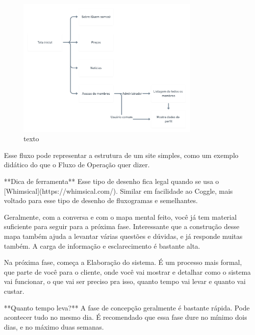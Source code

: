 \documentclass[a4paper, 12pt, oneside]{book}
\begin{document}
\begin{figure}[H]
	\caption{texto}
	\centering
	\includegraphics[width=0.8\textwidth]{Postagens2x.png}
\end{figure}

Esse fluxo pode representar a estrutura de um site simples, como um exemplo didático do que o Fluxo de Operação quer dizer.

**Dica de ferramenta**
Esse tipo de desenho fica legal quando se usa o [Whimsical](https://whimsical.com/). Similar em facilidade ao Coggle, mais voltado para esse tipo de desenho de fluxogramas e semelhantes.

Geralmente, com a conversa e com o mapa mental feito, você já tem material suficiente para seguir para a próxima fase. Interessante que a construção desse mapa também ajuda a levantar várias questões e dúvidas, e já responde muitas também. A carga de informação e esclarecimento é bastante alta.

Na próxima fase, começa a Elaboração do sistema. É um processo mais formal, que parte de você para o cliente, onde você vai mostrar e detalhar como o sistema vai funcionar, o que vai ser preciso pra isso, quanto tempo vai levar e quanto vai custar.

**Quanto tempo leva?**
A fase de concepção geralmente é bastante rápida. Pode acontecer tudo no mesmo dia. É recomendado que essa fase dure no mínimo dois dias, e no máximo duas semanas.
\end{document}
